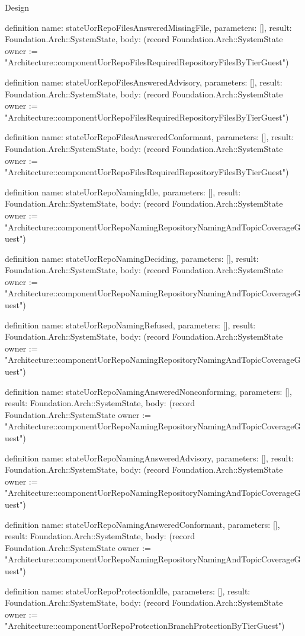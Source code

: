 \begin{lexlean}{Design}
\begin{semanticmodule}
definition{
  name: stateUorRepoFilesAnsweredMissingFile,
  parameters: [],
  result: Foundation.Arch::SystemState,
  body: (record Foundation.Arch::SystemState {owner := "Architecture::componentUorRepoFilesRequiredRepositoryFilesByTierGuest"})
}

definition{
  name: stateUorRepoFilesAnsweredAdvisory,
  parameters: [],
  result: Foundation.Arch::SystemState,
  body: (record Foundation.Arch::SystemState {owner := "Architecture::componentUorRepoFilesRequiredRepositoryFilesByTierGuest"})
}

definition{
  name: stateUorRepoFilesAnsweredConformant,
  parameters: [],
  result: Foundation.Arch::SystemState,
  body: (record Foundation.Arch::SystemState {owner := "Architecture::componentUorRepoFilesRequiredRepositoryFilesByTierGuest"})
}

definition{
  name: stateUorRepoNamingIdle,
  parameters: [],
  result: Foundation.Arch::SystemState,
  body: (record Foundation.Arch::SystemState {owner := "Architecture::componentUorRepoNamingRepositoryNamingAndTopicCoverageGuest"})
}

definition{
  name: stateUorRepoNamingDeciding,
  parameters: [],
  result: Foundation.Arch::SystemState,
  body: (record Foundation.Arch::SystemState {owner := "Architecture::componentUorRepoNamingRepositoryNamingAndTopicCoverageGuest"})
}

definition{
  name: stateUorRepoNamingRefused,
  parameters: [],
  result: Foundation.Arch::SystemState,
  body: (record Foundation.Arch::SystemState {owner := "Architecture::componentUorRepoNamingRepositoryNamingAndTopicCoverageGuest"})
}

definition{
  name: stateUorRepoNamingAnsweredNonconforming,
  parameters: [],
  result: Foundation.Arch::SystemState,
  body: (record Foundation.Arch::SystemState {owner := "Architecture::componentUorRepoNamingRepositoryNamingAndTopicCoverageGuest"})
}

definition{
  name: stateUorRepoNamingAnsweredAdvisory,
  parameters: [],
  result: Foundation.Arch::SystemState,
  body: (record Foundation.Arch::SystemState {owner := "Architecture::componentUorRepoNamingRepositoryNamingAndTopicCoverageGuest"})
}

definition{
  name: stateUorRepoNamingAnsweredConformant,
  parameters: [],
  result: Foundation.Arch::SystemState,
  body: (record Foundation.Arch::SystemState {owner := "Architecture::componentUorRepoNamingRepositoryNamingAndTopicCoverageGuest"})
}

definition{
  name: stateUorRepoProtectionIdle,
  parameters: [],
  result: Foundation.Arch::SystemState,
  body: (record Foundation.Arch::SystemState {owner := "Architecture::componentUorRepoProtectionBranchProtectionByTierGuest"})
}


\end{semanticmodule}
\end{lexlean}
